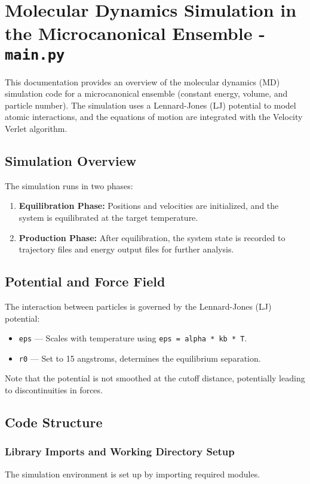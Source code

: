 \documentclass[12pt, ngerman]{report}
\begin{document}
	
\chapter{Molecular Dynamics Simulation in the Microcanonical Ensemble - \texttt{main.py}}
\label{chap:md_simulation}

This documentation provides an overview of the molecular dynamics (MD) simulation code for a microcanonical ensemble (constant energy, volume, and particle number). The simulation uses a Lennard-Jones (LJ) potential to model atomic interactions, and the equations of motion are integrated with the Velocity Verlet algorithm. 

\section{Simulation Overview}
The simulation runs in two phases:
\begin{enumerate}
	\item \textbf{Equilibration Phase:} Positions and velocities are initialized, and the system is equilibrated at the target temperature.
	\item \textbf{Production Phase:} After equilibration, the system state is recorded to trajectory files and energy output files for further analysis.
\end{enumerate}

\section{Potential and Force Field}
The interaction between particles is governed by the Lennard-Jones (LJ) potential:
\begin{itemize}
	\item \texttt{eps} --- Scales with temperature using \texttt{eps = alpha * kb * T}.
	\item \texttt{r0} --- Set to 15 angstroms, determines the equilibrium separation.
\end{itemize}
Note that the potential is not smoothed at the cutoff distance, potentially leading to discontinuities in forces.

\section{Code Structure}

\subsection{Library Imports and Working Directory Setup}
The simulation environment is set up by importing required modules.
\end{document}
